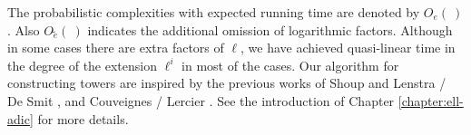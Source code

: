 \vspace*{4mm}

\vspace*{4mm}
The probabilistic complexities with expected running time are denoted by $O_e(\ )$. Also
$O\tilde{_e}(\ )$ indicates the additional omission of logarithmic factors. Although in some cases 
there are extra factors of $\ell$, we have achieved quasi-linear time in the degree of the 
extension $\ell^i$ in most of the cases. Our algorithm for constructing towers are inspired by the
previous works of Shoup \cite{Shoup90,shoup94} and Lenstra / De Smit 
\cite{lenstra+desmit08-stdmodels}, and Couveignes / Lercier \cite{couveignes+lercier11}. See the 
introduction of Chapter \ref{chapter:ell-adic} for more details.

